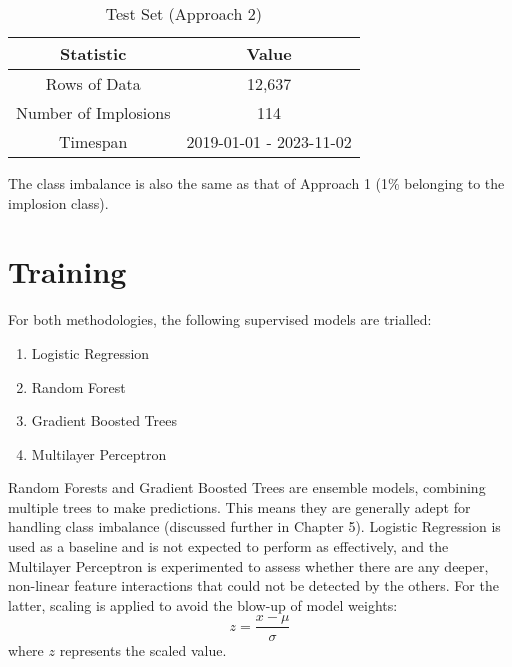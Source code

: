 \documentclass[a4paper]{report}
\begin{document}
\begin{table}[htbp]
  \centering
  \begin{tabular}{|c|c|}
  \hline
  \textbf{Statistic} & \textbf{Value} \\
  \hline
  Rows of Data & 12,637 \\
  Number of Implosions & 114 \\
  Timespan & 2019-01-01 - 2023-11-02 \\
  \hline
  \end{tabular}
  \caption{Test Set (Approach 2)}
  \label{tab:test_set_app2}
\end{table}
The class imbalance is also the same as that of Approach 1 (1\% belonging to the implosion class).

\section{Training} 
For both methodologies, the following supervised models are trialled:
\begin{enumerate}
  \item Logistic Regression
  \item Random Forest
  \item Gradient Boosted Trees
  \item Multilayer Perceptron
\end{enumerate}
Random Forests and Gradient Boosted Trees are ensemble models, combining multiple trees to make predictions. This means they are generally adept for handling 
class imbalance (discussed further in Chapter 5). Logistic Regression is used as a baseline and is not expected to perform as effectively, and the Multilayer Perceptron 
is experimented to assess whether there are any deeper, non-linear feature interactions that could not be detected by the others. For the latter, scaling 
is applied to avoid the blow-up of model weights: 
\begin{equation}
  z = \frac{x - \mu}{\sigma}
\end{equation}
where \(z\) represents the scaled value.
\end{document}
